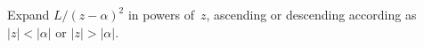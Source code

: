 Expand $L/(z - \alpha)^{2}$ in powers of~$z$, ascending or descending according
as $|z| < |\alpha|$ or $|z| > |\alpha|$.

